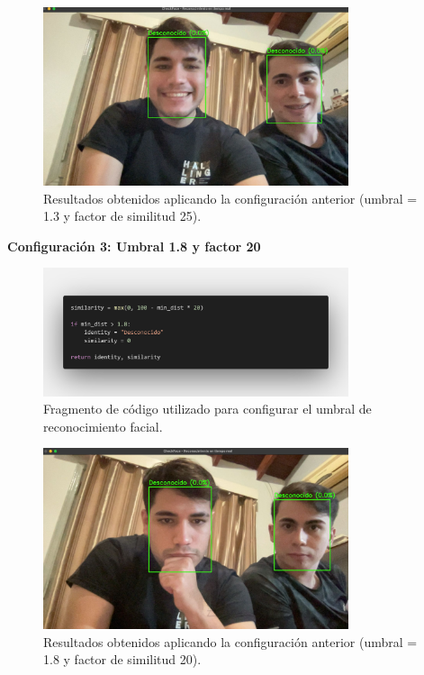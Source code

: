 \begin{figure}[H]
    \centering
    \includegraphics[width=0.8\textwidth]{capitulo_04/imagenes/1.3_min_dist25.jpg}
    \caption{Resultados obtenidos aplicando la configuración anterior (umbral = 1.3 y factor de similitud 25).}
\end{figure}

\newpage

\textbf{Configuración 3: Umbral 1.8 y factor 20}

\begin{figure}[H]
    \centering
    \includegraphics[width=0.8\textwidth]{capitulo_04/imagenes/3.png}
    \caption{Fragmento de código utilizado para configurar el umbral de reconocimiento facial.}
\end{figure}

\begin{figure}[H]
    \centering
    \includegraphics[width=0.8\textwidth]{capitulo_04/imagenes/umbral1.8min_dist20.jpg}
    \caption{Resultados obtenidos aplicando la configuración anterior (umbral = 1.8 y factor de similitud 20).}
\end{figure}

